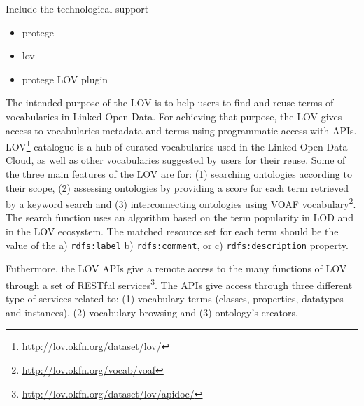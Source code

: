 Include the technological support
\begin{itemize}
	\item protege
	\item lov
	\item protege LOV plugin
\end{itemize}


The intended purpose of the LOV \cite{vandenbusschelov} is to help users to find and reuse terms of vocabularies in Linked Open Data. For achieving that purpose, the LOV gives access to vocabularies metadata and terms using programmatic access with APIs.  
LOV\footnote{\url{http://lov.okfn.org/dataset/lov/}} catalogue is a hub of curated vocabularies used in the Linked Open Data Cloud, as well as other vocabularies suggested by users for their reuse. 
Some of the three main features of the LOV are for: (1) searching ontologies according to their scope, (2) assessing ontologies by providing a score for each term retrieved by a keyword search and (3) interconnecting ontologies using VOAF vocabulary\footnote{\url{http://lov.okfn.org/vocab/voaf}}.
The search function uses an algorithm based on the term
popularity in LOD and in the LOV ecosystem. The matched resource set for each term should be the value of the a) {\tt rdfs:label} b) {\tt rdfs:comment}, or c) {\tt rdfs:description} property.


Futhermore, the LOV APIs give a remote access to the many functions of LOV through a set of RESTful services\footnote{\url{http://lov.okfn.org/dataset/lov/apidoc/}}. %
The APIs give access through three different type of services related to: (1) vocabulary terms (classes, properties, datatypes and instances), (2) vocabulary browsing and (3) ontology's creators. 


